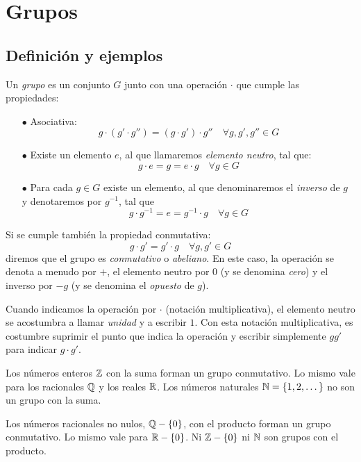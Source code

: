 \chapter{Grupos}

\section{Definición y ejemplos}
Un {\it grupo} es un conjunto $G$ junto con una operación $\cdot$ que cumple las propiedades:
\begin{itemize}
    \item[$\bullet$] Asociativa:
        $$g\cdot(g'\cdot g'')=(g\cdot g')\cdot g''\quad \forall g, g', g'' \in G$$

    \item[$\bullet$] Existe un elemento $e$, al que llamaremos {\it elemento neutro}, tal que:
        $$g\cdot e = g = e\cdot g \quad \forall g\in G$$

    \item[$\bullet$] Para cada $g\in G$ existe un elemento, al que denominaremos el {\it inverso} de $g$ y denotaremos por $g^{-1}$, tal que
        $$g\cdot g^{-1}=e=g^{-1}\cdot g \quad \forall g\in G$$
\end{itemize}

Si se cumple también la propiedad conmutativa:
$$g\cdot g' = g'\cdot g\quad\forall g,g'\in G$$
diremos que el grupo es {\it conmutativo} o {\it abeliano}. En este caso, la operación se denota a menudo por $+$, el elemento neutro por $0$ (y se denomina {\it cero}) y el inverso por $-g$ (y se denomina el {\it opuesto} de $g$).

Cuando indicamos la operación por $\cdot$ (notación multiplicativa), el elemento neutro se acostumbra a llamar {\it unidad} y a escribir $1$. Con esta notación multiplicativa, es costumbre suprimir el punto que indica la operación y escribir simplemente $gg'$ para indicar $g\cdot g'$.

\begin{example}
    Los números enteros $\mathbb{Z}$ con la suma forman un grupo conmutativo. Lo mismo vale para los racionales $\mathbb{Q}$ y los reales $\mathbb{R}$. Los números naturales $\mathbb{N}=\left\lbrace1,2,\dots\right\rbrace$ no son un grupo con la suma.

    Los números racionales no nulos, $\mathbb{Q}-\left\lbrace0\right\rbrace$, con el producto forman un grupo conmutativo. Lo mismo vale para $\mathbb{R}-\left\lbrace0\right\rbrace$. Ni $\mathbb{Z}-\left\lbrace0\right\rbrace$ ni $\mathbb{N}$ son grupos con el producto.
\end{example}

